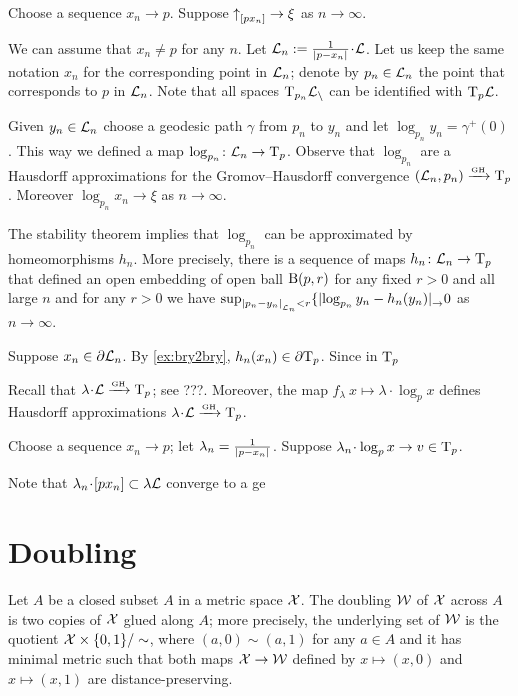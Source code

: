 Choose a sequence $x_n\to p$.
Suppose ${\uparrow}_{[{p}{x_n}]}\to\xi$ as $n\to\infty$.

We can assume that $x_n\ne p$ for any $n$.
Let $\spc{L}_n\df \tfrac1{\dist{p}{x_n}{}}\cdot\spc{L}$.
Let us keep the same notation $x_n$ for the corresponding point in $\mathcal{L}_n$;
denote by $p_n\in \mathcal{L}_n$ the point that corresponds to $p$ in  $\mathcal{L}_n$.
Note that all spaces $\mathrm{T}_{p_n}\mathcal{L_n}$ can be identified with $\mathrm{T}_p\mathcal{L}$.

Given $y_n\in \mathcal{L}_n$ choose a geodesic path $\gamma$ from $p_n$ to $y_n$
and let $\log_{p_n}y_n=\gamma^+(0)$.
This way we defined a map $\log_{p_n}\colon\mathcal{L}_n\to \mathrm{T}_p$.
Observe that $\log_{p_n}$ are a Hausdorff approximations for the Gromov--Hausdorff convergence 
$(\mathcal{L}_n,p_n)\xrightarrow{\mbox{\tiny\rm GH}} \mathrm{T}_p$.
Moreover $\log_{p_n}x_n\to \xi$ as $n\to \infty$.

The stability theorem implies that $\log_{p_n}$ can be approximated by homeomorphisms $h_n$.
More precisely, there is a sequence of maps $h_n\colon\mathcal{L}_n\to \mathrm{T}_p$
that defined an open embedding of open ball $\mathrm{B}{}(p,r)$ for any fixed $r>0$ and all large $n$
and for any $r>0$ we have $\sup_{\dist{p_n}{y_n}{\spc{L}_n}<r}\{\dist{\log_{p_n}y_n}{h_n(y_n)}\to 0$ as $n\to\infty$.

Suppose $x_n\in \partial\mathcal{L}_n$.
By \ref{ex:bry2bry}, $h_n(x_n)\in\partial \mathrm{T}_p$.
Since in $\mathrm{T}_p$

Recall that $\lambda\cdot \spc{L}\GHto \T_p$; see ???.
Moreover, the map $f_\lambda\:x\mapsto \lambda\cdot\log_px$ defines Hausdorff approximations $\lambda\cdot \spc{L}\GHto \T_p$.

 

Choose a sequence $x_n\to p$;
let $\lambda_n=\tfrac1{\dist{p}{x_n}{}}$.
Suppose $\lambda_n\cdot \log_px\to v\in\T_p$.



Note that $\lambda_n\cdot [p x_n]\subset \lambda\spc{L}$ converge to a ge

\qeds

\section{Doubling}

Let $A$ be a closed subset $A$ in a metric space $\mathcal{X}$.
The doubling $\mathcal{W}$ of $\mathcal{X}$ across $A$ is two copies of $\mathcal{X}$ glued along $A$;
more precisely, the underlying set of $\mathcal{W}$ is the quotient $\mathcal{X}\times\{0,1\}/\sim$, where $(a,0)\sim (a,1)$ for any $a\in A$ and it has minimal metric such that both maps $\mathcal{X}\to \mathcal{W}$ defined by $x\mapsto (x,0)$ and $x\mapsto (x,1)$ are distance-preserving.

